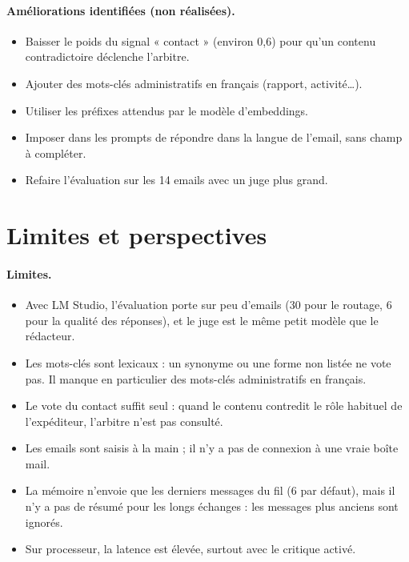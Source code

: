 \documentclass[11pt,a4paper]{article}
\begin{document}
\paragraph{Améliorations identifiées (non réalisées).}
\begin{itemize}
  \item Baisser le poids du signal « contact » (environ 0,6) pour qu'un contenu
        contradictoire déclenche l'arbitre.
  \item Ajouter des mots-clés administratifs en français (rapport, activité\ldots).
  \item Utiliser les préfixes attendus par le modèle d'embeddings.
  \item Imposer dans les prompts de répondre dans la langue de l'email, sans champ à
        compléter.
  \item Refaire l'évaluation sur les 14 emails avec un juge plus grand.
\end{itemize}

\section{Limites et perspectives}

\paragraph{Limites.}
\begin{itemize}
  \item Avec LM Studio, l'évaluation porte sur peu d'emails (30 pour le routage, 6 pour la
        qualité des réponses), et le juge est le même petit modèle que le rédacteur.
  \item Les mots-clés sont lexicaux : un synonyme ou une forme non listée ne vote pas. Il
        manque en particulier des mots-clés administratifs en français.
  \item Le vote du contact suffit seul : quand le contenu contredit le rôle habituel de
        l'expéditeur, l'arbitre n'est pas consulté.
  \item Les emails sont saisis à la main ; il n'y a pas de connexion à une vraie boîte mail.
  \item La mémoire n'envoie que les derniers messages du fil (6 par défaut), mais il n'y a
        pas de résumé pour les longs échanges : les messages plus anciens sont ignorés.
  \item Sur processeur, la latence est élevée, surtout avec le critique activé.
\end{itemize}
\end{document}

